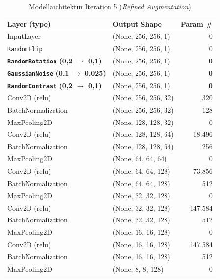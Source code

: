 \documentclass[
    a4paper,        %
    11pt,           %
    ngerman,        %
    parskip=half,   %
    listof=totoc,   %
    bibliography=totoc %
]{scrartcl}
\begin{document}
\begin{table}[H]
    \centering
    \caption{Modellarchitektur Iteration 5 (\textit{Refined Augmentation})}
    \label{tab:model_summary_iter5}
    \begin{tabular}{llr}
        \toprule
        \textbf{Layer (type)} & \textbf{Output Shape} & \textbf{Param \#} \\
        \midrule
        InputLayer & (None, 256, 256, 1) & 0 \\
        \texttt{RandomFlip} & (None, 256, 256, 1) & 0 \\
        \textbf{\texttt{RandomRotation} (0,2 $\rightarrow$ 0,1)} & (None, 256, 256, 1) & \textbf{0} \\
        \textbf{\texttt{GaussianNoise} (0,1 $\rightarrow$ 0,025)} & (None, 256, 256, 1) & \textbf{0} \\
        \textbf{\texttt{RandomContrast} (0,2 $\rightarrow$ 0,1)} & (None, 256, 256, 1) & \textbf{0} \\
        Conv2D (relu) & (None, 256, 256, 32) & 320 \\
        BatchNormalization & (None, 256, 256, 32) & 128 \\
        MaxPooling2D & (None, 128, 128, 32) & 0 \\
        Conv2D (relu) & (None, 128, 128, 64) & 18.496 \\
        BatchNormalization & (None, 128, 128, 64) & 256 \\
        MaxPooling2D & (None, 64, 64, 64) & 0 \\
        Conv2D (relu) & (None, 64, 64, 128) & 73.856 \\
        BatchNormalization & (None, 64, 64, 128) & 512 \\
        MaxPooling2D & (None, 32, 32, 128) & 0 \\
        Conv2D (relu) & (None, 32, 32, 128) & 147.584 \\
        BatchNormalization & (None, 32, 32, 128) & 512 \\
        MaxPooling2D & (None, 16, 16, 128) & 0 \\
        Conv2D (relu) & (None, 16, 16, 128) & 147.584 \\
        BatchNormalization & (None, 16, 16, 128) & 512 \\
        MaxPooling2D & (None, 8, 8, 128) & 0 \\

\end{tabular}
\end{table}
\end{document}
